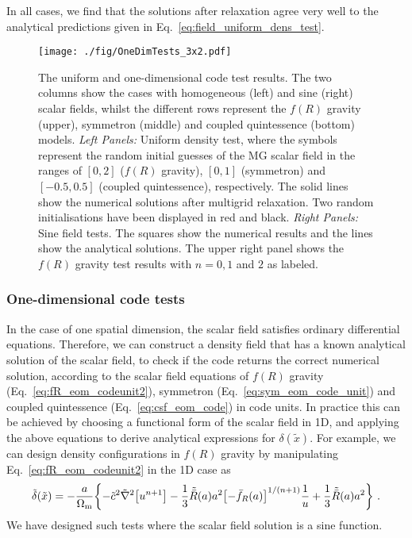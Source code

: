 In all cases, we find that the solutions after relaxation agree very well to the analytical predictions given in Eq.~\eqref{eq:field_uniform_dens_test}.


\begin{figure}
    \centering
    \texttt{[image: ./fig/OneDimTests\_3x2.pdf]}
    \caption{The uniform and one-dimensional code test results. The two columns show the cases with homogeneous (left) and sine (right) scalar fields, whilst the different rows represent the $f(R)$ gravity (upper), symmetron (middle) and coupled quintessence (bottom) models. \textit{Left Panels:} Uniform density test, where the symbols represent the random initial guesses of the \ac{MG} scalar field in the ranges of $[0, 2]$ ($f(R)$ gravity), $[0, 1]$ (symmetron) and $[-0.5, 0.5]$ (coupled quintessence), respectively. The solid lines show the numerical solutions after multigrid relaxation. Two random initialisations have been displayed in red and black. \textit{Right Panels:} Sine field tests. The squares show the numerical results and the lines show the analytical solutions. The upper right panel shows the $f(R)$ gravity test results with $n = 0, 1$ and $2$ as labeled.
    }
    \label{fig:code_test_1D_3x2}
\end{figure}

\subsubsection{One-dimensional code tests}
\label{subsubsect:1D_tests}

In the case of one spatial dimension, the scalar field satisfies ordinary differential equations. Therefore, we can construct a density field that has a known analytical solution of the scalar field, to check if the code returns the correct numerical solution, according to the scalar field equations of $f(R)$ gravity (Eq.~\eqref{eq:fR_eom_codeunit2}), symmetron (Eq.~\eqref{eq:sym_eom_code_unit}) and coupled quintessence (Eq.~\eqref{eq:csf_eom_code}) in code units. In practice this can be achieved by choosing a functional form of the scalar field in 1D, and applying the above equations to derive analytical expressions for $\delta(\tilde{x})$. For example, we can design density configurations in $f(R)$ gravity by manipulating Eq.~\eqref{eq:fR_eom_codeunit2} in the 1D case as 
\begin{align}
    \tilde{\delta}(\tilde{x}) = -\frac{a}{\Omega_{\rm m}} \qty{ -\tilde{c}^2 \tilde{\nabla}^2 \qty[u^{n+1}] - \frac{1}{3} \tilde{\bar{R}}(a) a^2 \qty[-\bar{f}_R (a)]^{1/(n+1)} \frac{1}{u} + \frac{1}{3} \tilde{\bar{R}}(a) a^2 } \ . \label{eq:fR_eom_codeunit2_CodeTestForm}
\end{align}
We have designed such tests where the scalar field solution is a sine function. 

